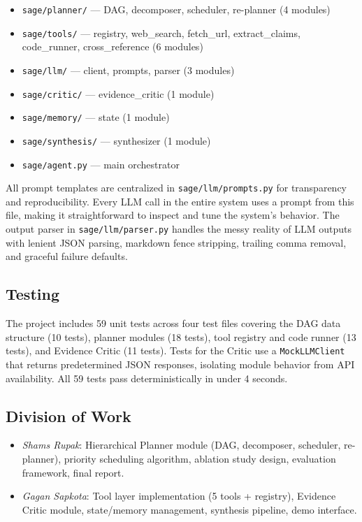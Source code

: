 \documentclass[11pt]{article}
\begin{document}
\begin{itemize}[leftmargin=1.5em, itemsep=1pt]
  \item \texttt{sage/planner/} --- DAG, decomposer, scheduler, re-planner (4 modules)
  \item \texttt{sage/tools/} --- registry, web\_search, fetch\_url, extract\_claims, code\_runner, cross\_reference (6 modules)
  \item \texttt{sage/llm/} --- client, prompts, parser (3 modules)
  \item \texttt{sage/critic/} --- evidence\_critic (1 module)
  \item \texttt{sage/memory/} --- state (1 module)
  \item \texttt{sage/synthesis/} --- synthesizer (1 module)
  \item \texttt{sage/agent.py} --- main orchestrator
\end{itemize}

All prompt templates are centralized in \texttt{sage/llm/prompts.py} for transparency and reproducibility. Every LLM call in the entire system uses a prompt from this file, making it straightforward to inspect and tune the system's behavior. The output parser in \texttt{sage/llm/parser.py} handles the messy reality of LLM outputs with lenient JSON parsing, markdown fence stripping, trailing comma removal, and graceful failure defaults.

\subsection{Testing}

The project includes 59 unit tests across four test files covering the DAG data structure (10 tests), planner modules (18 tests), tool registry and code runner (13 tests), and Evidence Critic (11 tests). Tests for the Critic use a \texttt{MockLLMClient} that returns predetermined JSON responses, isolating module behavior from API availability. All 59 tests pass deterministically in under 4 seconds.

\subsection{Division of Work}

\begin{itemize}[leftmargin=1.5em, itemsep=2pt]
  \item \textit{Shams Rupak}: Hierarchical Planner module (DAG, decomposer, scheduler, re-planner), priority scheduling algorithm, ablation study design, evaluation framework, final report.
  \item \textit{Gagan Sapkota}: Tool layer implementation (5 tools + registry), Evidence Critic module, state/memory management, synthesis pipeline, demo interface.
\end{itemize}
\end{document}
